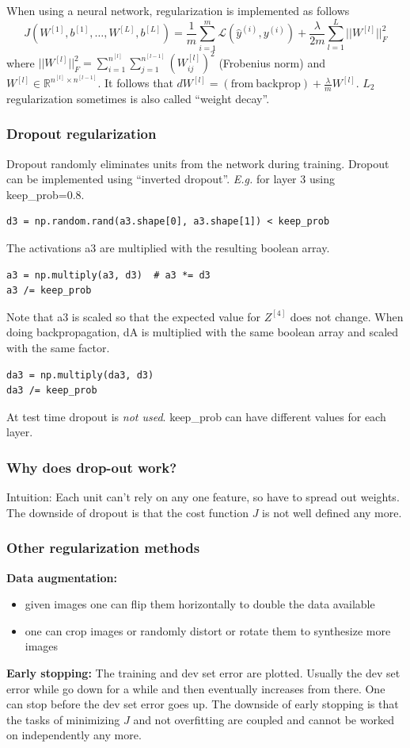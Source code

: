 \documentclass{article}
\begin{document}
When using a neural network, regularization is implemented as follows
\begin{equation}
  J(W^{[1]},b^{[1]},\ldots,W^{[L]},b^{[L]})=\frac{1}{m}\sum_{i=1}^m\mathcal{L}(\hat{y}^{(i)},y^{(i)})
  +\frac{\lambda}{2m}\sum_{l=1}^L||W^{[l]}||_F^2
\end{equation}
where $||W^{[l]}||_F^2=\sum_{i=1}^{n^{[l]}}\sum_{j=1}^{n^{[l-1]}}(W^{[l]}_{ij})^2$ (Frobenius norm) and
$W^{[l]}\in\mathbb{R}^{n^{[l]}\times n^{[l-1]}}$.
It follows that $dW^{[l]}=(\mathrm{from\ backprop})+\frac{\lambda}{m}W^{[l]}$.
$L_2$ regularization sometimes is also called ``weight decay''.

\subsubsection{Dropout regularization}
Dropout randomly eliminates units from the network during training.
Dropout can be implemented using ``inverted dropout''.
\emph{E.g.} for layer 3 using keep\_prob=0.8.
\begin{verbatim}
d3 = np.random.rand(a3.shape[0], a3.shape[1]) < keep_prob
\end{verbatim}
The activations a3 are multiplied with the resulting boolean array.
\begin{verbatim}
a3 = np.multiply(a3, d3)  # a3 *= d3
a3 /= keep_prob
\end{verbatim}
Note that a3 is scaled so that the expected value for $Z^{[4]}$ does not change.
When doing backpropagation, dA is multiplied with the same boolean array and scaled with the same factor.
\begin{verbatim}
da3 = np.multiply(da3, d3)
da3 /= keep_prob
\end{verbatim}
At test time dropout is \emph{not used}.
keep\_prob can have different values for each layer.

\subsubsection{Why does drop-out work?}
Intuition: Each unit can't rely on any one feature, so have to spread out weights.
The downside of dropout is that the cost function $J$ is not well defined any more.

\subsubsection{Other regularization methods}
\textbf{Data augmentation:}
\begin{itemize}
  \item given images one can flip them horizontally to double the data available
  \item one can crop images or randomly distort or rotate them to synthesize more images
\end{itemize}
\textbf{Early stopping:}
The training and dev set error are plotted.
Usually the dev set error while go down for a while and then eventually increases from there.
One can stop before the dev set error goes up.
The downside of early stopping is that the tasks of minimizing $J$ and not overfitting are coupled
and cannot be worked on independently any more.
\end{document}
